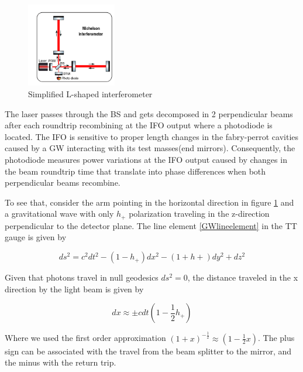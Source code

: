 \begin{figure}[hbt!]
\begin{center}
\includegraphics[width=0.35\textwidth, angle=0]{images/IFO.png}
\captionsetup{width=0.8\textwidth}
\caption{Simplified L-shaped interferometer}
\label{IFO}
\end{center}
\end{figure}

\FloatBarrier

The laser passes through the BS and gets decomposed in 2 perpendicular beams after each roundtrip recombining at the IFO output where a photodiode is located. The IFO is sensitive to proper length changes in the fabry-perrot cavities caused by a GW interacting with its test masses(end mirrors). Consequently, the photodiode measures power variations at the IFO output caused by changes in the beam roundtrip time that translate into phase differences when both perpendicular beams recombine.

To see that, consider the arm pointing in the horizontal direction in figure \ref{IFO} and a gravitational wave with only $h_+$  polarization traveling in the z-direction perpendicular to the detector plane. The line element \ref{GWlineelement} in the TT gauge is given by

\begin{equation}
ds^2 = c^2 dt^2 - (1-h_+) dx^2 - (1+h+) dy^2 + dz^2
\end{equation}

Given that photons travel in null geodesics $ds^2 = 0$, the distance traveled in the x direction by the light beam is given by

\begin{equation}\label{dx}
dx \approx \pm cdt \left(  1-\frac{1}{2} h_+ \right)
\end{equation}

Where we used the first order approximation $(1+x)^{-\frac{1}{2}} \approx (1 - \frac{1}{2} x)$. The plus sign can be associated with the travel from the beam splitter to the mirror, and the minus with the return trip. 

